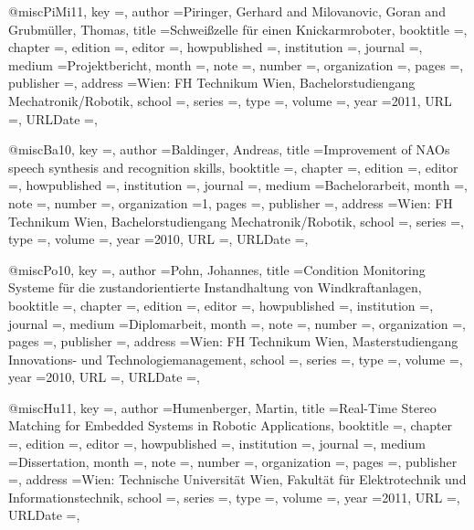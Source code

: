 @misc{PiMi11,
	key					={},
	author				={Piringer, Gerhard and Milovanovic, Goran and Grubmüller, Thomas},
	title				={Schweißzelle für einen Knickarmroboter},
	booktitle			={},
	chapter				={},
	edition				={},
	editor				={},
	howpublished		={},
	institution			={},
	journal				={},
	medium				={Projektbericht},
	month				={},
	note				={},
	number				={},
	organization		={},
	pages				={},
	publisher			={},
	address				={Wien: FH Technikum Wien, Bachelorstudiengang Mechatronik/Robotik},
	school				={},
	series				={},
	type				={},
	volume				={},
	year				={2011},
	URL	  				={},
	URLDate				={},
}

@misc{Ba10,
	key					={},
	author				={Baldinger, Andreas},
	title				={Improvement of NAOs speech synthesis and recognition skills},
	booktitle			={},
	chapter				={},
	edition				={},
	editor				={},
	howpublished		={},
	institution			={},
	journal				={},
	medium				={Bachelorarbeit},	
	month				={},
	note				={},
	number				={},
	organization		={1},
	pages				={},
	publisher			={},
	address				={Wien: FH Technikum Wien, Bachelorstudiengang Mechatronik/Robotik},
	school				={},
	series				={},
	type				={},
	volume				={},
	year				={2010},
	URL	  				={},
	URLDate				={},
}

@misc{Po10,
	key					={},
	author				={Pohn, Johannes},
	title				={Condition Monitoring Systeme für die zustandorientierte Instandhaltung von Windkraftanlagen},
	booktitle			={},
	chapter				={},
	edition				={},
	editor				={},
	howpublished		={},
	institution			={},
	journal				={},
	medium				={Diplomarbeit},
	month				={},
	note				={},
	number				={},
	organization		={},
	pages				={},
	publisher			={},
	address				={Wien: FH Technikum Wien, Masterstudiengang Innovations- und Technologiemanagement},
	school				={},
	series				={},
	type				={},
	volume				={},
	year				={2010},
	URL	  				={},
	URLDate				={},
}

@misc{Hu11,
	key					={},
	author				={Humenberger, Martin},
	title				={Real-Time Stereo Matching for Embedded Systems in Robotic Applications},
	booktitle			={},
	chapter				={},
	edition				={},
	editor				={},
	howpublished		={},
	institution			={},
	journal				={},
	medium				={Dissertation},
	month				={},
	note				={},
	number				={},
	organization		={},
	pages				={},
	publisher			={},
	address				={Wien: Technische Universit{\"a}t Wien, Fakult{\"a}t für Elektrotechnik und Informationstechnik},
	school				={},
	series				={},
	type				={},
	volume				={},
	year				={2011},
	URL	  				={},
	URLDate				={},
}

